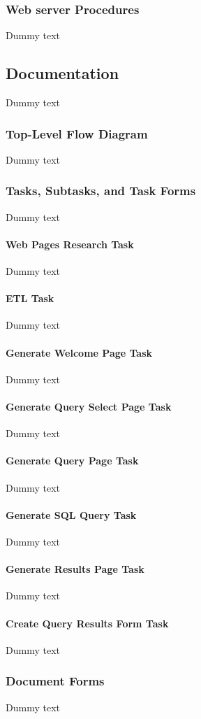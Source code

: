 \documentclass{article}
\begin{document}
\subsubsection{Web server Procedures}
Dummy text


\subsection{Documentation}
Dummy text

\subsubsection{Top-Level Flow Diagram}
Dummy text

\subsubsection{Tasks, Subtasks, and Task Forms}
Dummy text
\paragraph{Web Pages Research Task\\}
Dummy text
\paragraph{ETL Task\\}
Dummy text
\paragraph{Generate Welcome Page Task\\}
Dummy text
\paragraph{Generate Query Select Page Task\\}
Dummy text
\paragraph{Generate Query Page Task\\}
Dummy text
\paragraph{Generate SQL Query Task\\}
Dummy text
\paragraph{Generate Results Page Task\\}
Dummy text
\paragraph{Create Query Results Form Task\\}
Dummy text

\subsubsection{Document Forms}
Dummy text
\end{document}
